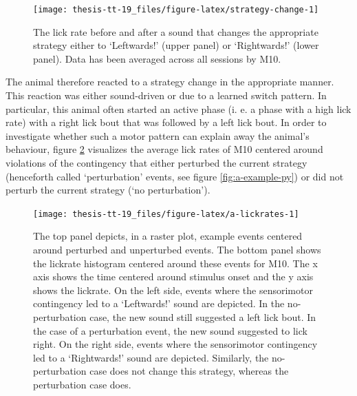 \documentclass[]{report}
\theoremstyle{definition}
\theoremstyle{definition}
\theoremstyle{definition}
\theoremstyle{remark}
\begin{document}
\begin{figure}

{\centering \texttt{[image: thesis-tt-19\_files/figure-latex/strategy-change-1]} 

}

\caption{The lick rate before and after a sound that
changes the appropriate strategy either to `Leftwards!' (upper panel) or
`Rightwards!' (lower panel). Data has been averaged across all sessions
by M10.}\label{fig:strategy-change}
\end{figure}






The animal therefore reacted to a strategy change in the appropriate
manner. This reaction was either sound-driven or due to a learned switch
pattern. In particular, this animal often started an active phase (i. e.
a phase with a high lick rate) with a right lick bout that was followed
by a left lick bout. In order to investigate whether such a motor
pattern can explain away the animal's behaviour, figure
\ref{fig:a-lickrates} visualizes the average lick rates of M10 centered
around violations of the contingency that either perturbed the current
strategy (henceforth called `perturbation' events, see figure
\ref{fig:a-example-py}) or did not perturb the current strategy (`no
perturbation').

\begin{figure}

{\centering \texttt{[image: thesis-tt-19\_files/figure-latex/a-lickrates-1]} 

}

\caption{The top panel depicts, in a raster plot, example
events centered around perturbed and unperturbed events. The bottom
panel shows the lickrate histogram centered around these events for M10.
The x axis shows the time centered around stimulus onset and the y axis
shows the lickrate. On the left side, events where the sensorimotor
contingency led to a `Leftwards!' sound are depicted. In the
no-perturbation case, the new sound still suggested a left lick bout. In
the case of a perturbation event, the new sound suggested to lick right.
On the right side, events where the sensorimotor contingency led to a
`Rightwards!' sound are depicted. Similarly, the no-perturbation case
does not change this strategy, whereas the perturbation case does.}\label{fig:a-lickrates}
\end{figure}
\end{document}
